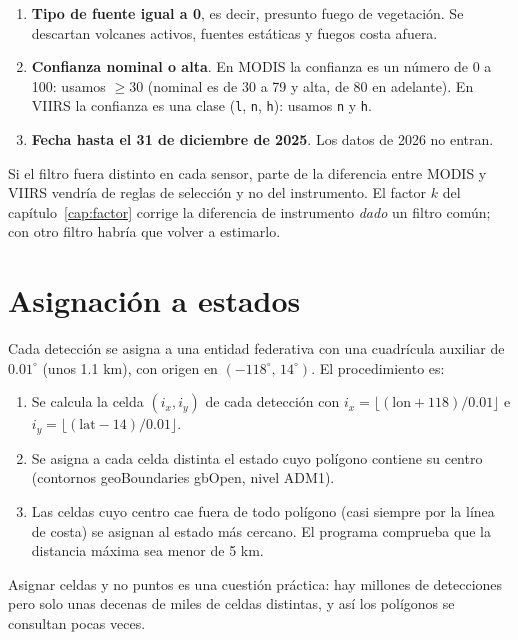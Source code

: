 \begin{enumerate}[label=\arabic*)]
  \item \textbf{Tipo de fuente igual a 0}, es decir, presunto fuego de vegetación. Se descartan volcanes activos, fuentes estáticas y fuegos costa afuera.
  \item \textbf{Confianza nominal o alta}. En MODIS la confianza es un número de 0 a 100: usamos $\geq 30$ (nominal es de 30 a 79 y alta, de 80 en adelante). En VIIRS la confianza es una clase (\texttt{l}, \texttt{n}, \texttt{h}): usamos \texttt{n} y \texttt{h}.
  \item \textbf{Fecha hasta el 31 de diciembre de 2025}. Los datos de 2026 no entran.
\end{enumerate}

\begin{cuidado}
Si el filtro fuera distinto en cada sensor, parte de la diferencia entre MODIS y VIIRS vendría de reglas de selección y no del instrumento. El factor $k$ del capítulo~\ref{cap:factor} corrige la diferencia de instrumento \emph{dado} un filtro común; con otro filtro habría que volver a estimarlo.
\end{cuidado}

\section{Asignación a estados}

Cada detección se asigna a una entidad federativa con una cuadrícula auxiliar de $0.01^\circ$ (unos 1.1 km), con origen en $(-118^\circ,\,14^\circ)$. El procedimiento es:

\begin{enumerate}[label=\arabic*)]
  \item Se calcula la celda $(i_x,i_y)$ de cada detección con $i_x=\lfloor (\text{lon}+118)/0.01\rfloor$ e $i_y=\lfloor (\text{lat}-14)/0.01\rfloor$.
  \item Se asigna a cada celda distinta el estado cuyo polígono contiene su centro (contornos geoBoundaries gbOpen, nivel ADM1).
  \item Las celdas cuyo centro cae fuera de todo polígono (casi siempre por la línea de costa) se asignan al estado más cercano. El programa comprueba que la distancia máxima sea menor de 5 km.
\end{enumerate}

Asignar celdas y no puntos es una cuestión práctica: hay millones de detecciones pero solo unas decenas de miles de celdas distintas, y así los polígonos se consultan pocas veces.

